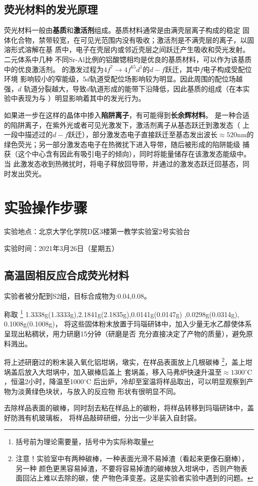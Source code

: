 \documentclass[a4paper,zihao=5,UTF8]{ctexart}
\newcommand{\mr}[1]{\mathrm{#1}}
\def\celsius{$^{\circ}\mr{C}$}
\begin{document}
	\subsection{荧光材料的发光原理}
	荧光材料一般由\textbf{基质}和\textbf{激活剂}组成。基质材料通常是由满壳层离子构成的稳定
	固体化合物，禁带较宽，在可见光范围内没有吸收；激活剂是不满壳层的离子，以固溶形式溶解在基
	质中，电子在壳层内或邻近壳层之间跃迁产生吸收和荧光发射。二元体系中几种
	不同Sr-Al比例的铝酸锶相均是优良的基质材料，可以作为该基质中的优良激活剂。
	的激发过程为$4f^7\to4f^ 65d ^1$的$d-f$跃迁，其中$f$电子构成受配位环境
	影响较小的窄能级，$5d$轨道受配位场影响较为明显。因此周围的配位场越强，$d$
	轨道分裂越大，导致$d$轨道形成的能带下沿降低，因此基质的组成（在本实验中表现为与
	）明显影响着其中的发光行为。
	\par 
	如果进一步在这样的晶体中掺入\textbf{陷阱离子}，有可能得到\textbf{长余辉材料}。
	是一种合适的陷阱离子，在紫外光或者可见光激发下，激活剂离子从基态跃迁到激发态（
	上一段中描述过的$d-f$跃迁），部分激发态电子直接跃迁至基态发出波长$\approx 520\mr{nm}$的
	绿色荧光；另一部分激发态电子在热微扰下进入导带，随后被形成的陷阱能级
	捕获（这个中心含有因此有吸引电子的倾向），同时将能量储存在该激发态能级中。当
	此激发态收到热微扰时，将电子释放回导带，并通过的激发态跃迁回基态，同时发出荧光。
	\section{实验操作步骤}
	实验地点：北京大学化学院D区3楼第一教学实验室2号实验台
	\par 
	实验时间：2021年3月26日（星期五）
	\subsection{高温固相反应合成荧光材料}
	实验者被分配到S2组，目标合成物为:0.04,0.08。
	\par 
	称取
	\footnote{括号前为理论需要量，括号中为实际称取量}
	1.3338g(1.3333g),2.1841g(2.1835g),0.0141g(0.0147g)
	,0.0298g(0.0314g),\\0.1008g(0.1008g)，
	将这些固体粉末放置于玛瑙研钵中，加入少量无水乙醇使体系呈现出粘稠状，用力研磨15分钟（研磨是否
	充分直接决定了产物的质量），避免原料溅出。
	\par
	将上述研磨过的粉末装入氧化铝坩埚，墩实，在样品表面放上几根碳棒
	\footnote{注意！实验室中有两种碳棒，一种表面光滑不易掉渣（看起来更像石磨棒），另一种
	颜色更黑容易掉渣，不要将容易掉渣的碳棒放入坩埚中，否则产物表面回沾上难以去除的碳，使
	产物色泽变差。这是实验者实验中遇到的问题。}，盖上坩埚盖后放入大坩埚中，加入碳棒后盖上
	套埚盖，移入马弗炉快速升温至$\approx 1300$\celsius，恒温2小时，降温至1000\celsius
	后出炉，冷却至室温将样品取出，可以明显观察到产物为淡黄绿色块状，与放入的反应物
	形状有很明显不同。
	\par 
	去除样品表面的碳棒，同时刮去粘在样品上的碳粉，将样品转移到玛瑙研钵中，盖好防溅有机玻璃板，
	将样品敲碎研细，分出一少半装入自封袋。
\end{document}
